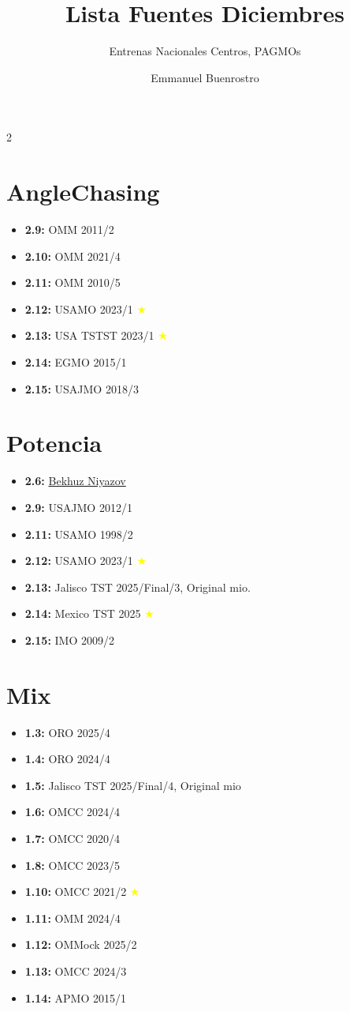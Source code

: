 \documentclass[11pt]{scrartcl}
\title {Lista Fuentes Diciembres}
\subtitle{Entrenas Nacionales Centros, PAGMOs}
\author{Emmanuel Buenrostro}
\newcommand{\gad}{\textcolor{yellow}{$\bigstar$}}
\begin{document}
\maketitle
\begin{multicols}{2}
\section{AngleChasing}
\begin{itemize}
    \item \textbf{2.9: } OMM 2011/2
    \item \textbf{2.10: } OMM 2021/4
    \item \textbf{2.11:} OMM 2010/5
    \item \textbf{2.12:} USAMO 2023/1 \gad
    \item \textbf{2.13:} USA TSTST 2023/1 \gad
    \item \textbf{2.14:} EGMO 2015/1
    \item \textbf{2.15:} USAJMO 2018/3
\end{itemize}

\section{Potencia}
\begin{itemize}
    \item \textbf{2.6: } \href{https://medium.com/intuition/a-geometry-problem-solved-using-radical-axes-77b2dbbc282e}{Bekhuz Niyazov}
    \item \textbf{2.9: } USAJMO 2012/1
    \item \textbf{2.11:} USAMO 1998/2
    \item \textbf{2.12:} USAMO 2023/1 \gad 
    \item \textbf{2.13:} Jalisco TST 2025/Final/3, Original mio. 
    \item \textbf{2.14: } Mexico TST 2025 \gad 
    \item \textbf{2.15: } IMO 2009/2
\end{itemize}

\section{Mix}
\begin{itemize}
    \item \textbf{1.3:} ORO 2025/4
    \item \textbf{1.4:} ORO 2024/4
    \item \textbf{1.5:} Jalisco TST 2025/Final/4, Original mio 
    \item \textbf{1.6:} OMCC 2024/4
    \item \textbf{1.7: } OMCC 2020/4
    \item \textbf{1.8: } OMCC 2023/5
    \item \textbf{1.10:} OMCC 2021/2 \gad 
    \item \textbf{1.11: } OMM 2024/4
    \item \textbf{1.12: } OMMock 2025/2
    \item \textbf{1.13:} OMCC 2024/3
    \item \textbf{1.14:} APMO 2015/1
\end{itemize}
\end{multicols}
\end{document}
